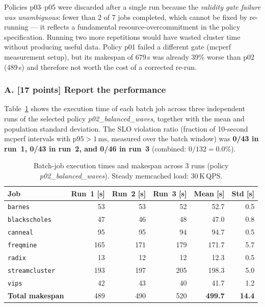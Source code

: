 \noindent
Policies p03–p05 were discarded after a single run because the
\emph{validity gate failure was unambiguous}: fewer than 2 of 7 jobs
completed, which cannot be fixed by re-running — it reflects a
fundamental resource-overcommitment in the policy specification.
Running two more repetitions would have wasted cluster time without
producing useful data.
Policy p01 failed a different gate (mcperf measurement setup), but its
makespan of 679\,s was already 39\% worse than p02 (489\,s) and therefore
not worth the cost of a corrected re-run.

\subsubsection*{A. [17 points] Report the performance}

Table~\ref{tab:p3_runtimes} shows the execution time of each batch job across
three independent runs of the selected policy \emph{p02\_balanced\_waves},
together with the mean and population standard deviation.
The SLO violation ratio (fraction of 10-second mcperf intervals with
$\mathrm{p95} > 1\,\mathrm{ms}$, measured over the batch window) was
\textbf{0/43 in run~1, 0/43 in run~2, and 0/46 in run~3}
(combined: $0/132 = 0.0\%$).

\begin{table}[h]
\centering
\caption{Batch-job execution times and makespan across 3 runs (policy
  \emph{p02\_balanced\_waves}).  Steady memcached load: 30\,K\,QPS.}
\label{tab:p3_runtimes}
\begin{tabular}{lrrrrr}
\toprule
\textbf{Job} & \textbf{Run~1 [s]} & \textbf{Run~2 [s]} & \textbf{Run~3 [s]}
             & \textbf{Mean [s]} & \textbf{Std [s]} \\
\midrule
\texttt{barnes}        &  53 &  53 &  52 &  52.7 & 0.5 \\
\texttt{blackscholes}  &  47 &  46 &  48 &  47.0 & 0.8 \\
\texttt{canneal}       &  95 &  95 &  94 &  94.7 & 0.5 \\
\texttt{freqmine}      & 165 & 171 & 179 & 171.7 & 5.7 \\
\texttt{radix}         &  13 &  12 &  12 &  12.3 & 0.5 \\
\texttt{streamcluster} & 193 & 197 & 205 & 198.3 & 5.0 \\
\texttt{vips}          &  42 &  43 &  40 &  41.7 & 1.2 \\
\midrule
\textbf{Total makespan} & 489 & 490 & 520 & \textbf{499.7} & \textbf{14.4} \\
\bottomrule
\end{tabular}
\end{table}

